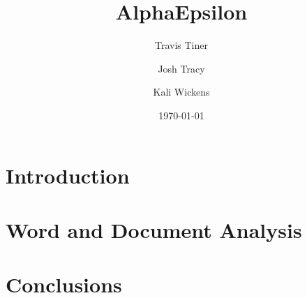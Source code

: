 \documentclass[11pt]{article}
\title{AlphaEpsilon}
\author{Travis Tiner}
\author{Josh Tracy}
\author{Kali Wickens}
\affil{University of Utah -- Deep Learning}
\date{\today}
\begin{document}
\maketitle

\begin{abstract}
	
\end{abstract}

\section{Introduction}

\section{Word and Document Analysis}

\section{Conclusions}




%
%
%
%
%
\end{document}
